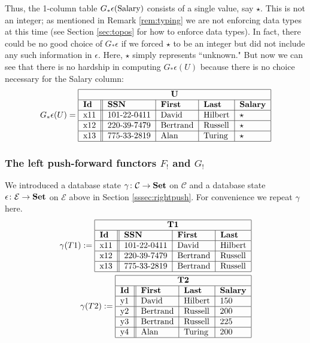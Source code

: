 \documentclass{amsart}
\def\tn{\textnormal}
\def\mc{\mathcal}
\def\to{\rightarrow}
\def\taking{\colon}
\def\Set{{\bf Set}}
\def\mcC{\mc{C}}
\def\mcE{\mc{E}}
\theoremstyle{remark}
\theoremstyle{definition}
\begin{document}
Thus, the 1-column table $G_*\epsilon(\tn{Salary})$ consists of a single value, say $\star$.  This is not an integer; as mentioned in Remark \ref{rem:typing} we are not enforcing data types at this time (see Section \ref{sec:topos} for how to enforce data types).  In fact, there could be no good choice of $G_*\epsilon$ if we forced $\star$ to be an integer but did not include any such information in $\epsilon$.  Here, $\star$ simply represents ``unknown."  But now we can see that there is no hardship in computing $G_*\epsilon(U)$ because there is no choice necessary for the Salary column:   \begin{align*}G_*\epsilon(U)=\begin{tabular}{| l || l | l | l | l |}\hline\multicolumn{5}{| c |}{\bf U}\\\hline{\bf Id}&{\bf SSN}&{\bf First}&{\bf Last}&{\bf Salary}\\\hline x11&101-22-0411&David&Hilbert&$\star$\\\hline x12&220-39-7479&Bertrand&Russell&$\star$\\\hline x13&775-33-2819&Alan&Turing&$\star$\\\hline\end{tabular}\end{align*}

\subsubsection{The left push-forward functors $F_!$ and $G_!$}

We introduced a database state $\gamma\taking\mcC\to\Set$ on $\mcC$ and a database state $\epsilon\taking\mcE\to\Set$ on $\mcE$ above in Section \ref{sssec:rightpush}.  For convenience we repeat $\gamma$ here.  \vspace{1in}\begin{align}\label{dia:gamma1}\gamma(T1):=\begin{tabular}{| l || l | l | l |}\hline\multicolumn{4}{| c |}{\bf T1}\\\hline{\bf Id}&{\bf SSN}&{\bf First}&{\bf Last}\\\hline x11&101-22-0411&David&Hilbert\\\hline x12&220-39-7479&Bertrand&Russell\\\hline x13&775-33-2819&Bertrand&Russell\\\hline\end{tabular}\\\label{dia:gamma2} \gamma(T2):=\begin{tabular}{| l || l | l | l |}\hline\multicolumn{4}{| c |}{\bf T2}\\\hline{\bf Id}&{\bf First}&{\bf Last}&{\bf Salary}\\\hline y1&David&Hilbert&150\\\hline y2&Bertrand&Russell&200\\\hline y3&Bertrand&Russell&225\\\hline y4&Alan&Turing&200\\\hline\end{tabular}\end{align}
\end{document}
